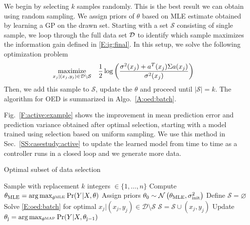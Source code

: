 We begin by selecting \(k\) samples randomly. This is the best result we can obtain using random sampling. We assign priors of \(\theta\) based on MLE estimate obtained by learning a GP on the drawn set.
Starting with a set \(\mathcal{S}\) consisting of single sample, we loop through the full data set \(\mathcal{D}\) to identify which sample maximizes the information gain defined in \eqref{E:ig:final}. In this setup, we solve the following optimization problem
\begin{align}
\label{E:oed:batch}
\maximize_{x_{j}|(x_j,y_j) \in \mathcal{D} \setminus \mathcal{S}} & \ \ \ \frac{1}{2}\log\left(\frac{\sigma^2(x_j)+a^T(x_j)\Sigma a(x_j)}{\sigma^2(x_j)}\right)
\end{align}
Then, we add this sample to \(\mathcal{S}\), update the \(\theta\)  and proceed until \(|\mathcal{S}|=k\).
The algorithm for OED is summarized in Algo.~\ref{A:oed:batch}. 

Fig.~\ref{F:active:example} shows the improvement in mean prediction error and prediction variance obtained after optimal selection, starting with a model trained using selection based on uniform sampling. We use this method in Sec.~\ref{SS:casestudy:active} to update the learned model from time to time as a controller runs in a closed loop and we generate more data.

\begin{algorithm}[!tb]
	\caption{Optimal subset of data selection}
	\label{A:oed:batch}
	\begin{algorithmic}[1]
		\State Sample with replacement \(k\) integers \( \in \{1,\dots,n\} \)
		\State Compute \( \theta_{\mathrm{MLE}} = \operatorname*{arg\,max}_{\theta^{\mathrm{MLE}}} \Pr(Y \vert X, \theta)\)
		\State Assign priors \(\theta_{\mathrm{0}} \sim \operatorname*{\mathcal{N}}\left(\theta_{\mathrm{MLE}}, \sigma^2_{\mathrm{init}}\right)\)
		\EndProcedure
		\State Define \(\mathcal{S} = \varnothing\)
		\State Solve \eqref{E:oed:batch} for optimal \({x_{j} \vert (x_j,y_j) \in \mathcal{D} \setminus \mathcal{S}} \)
		\State \(\mathcal{S} = \mathcal{S} \cup (x_j,y_j) \)
		\State Update \( \theta_{\mathrm{j}} = \operatorname*{arg\,max}_{\theta^{\mathrm{MAP}}} \Pr(Y \vert X, \theta_{\mathrm{j-1}})\)
		\EndWhile
		\EndProcedure
	\end{algorithmic}
\end{algorithm}

%	

